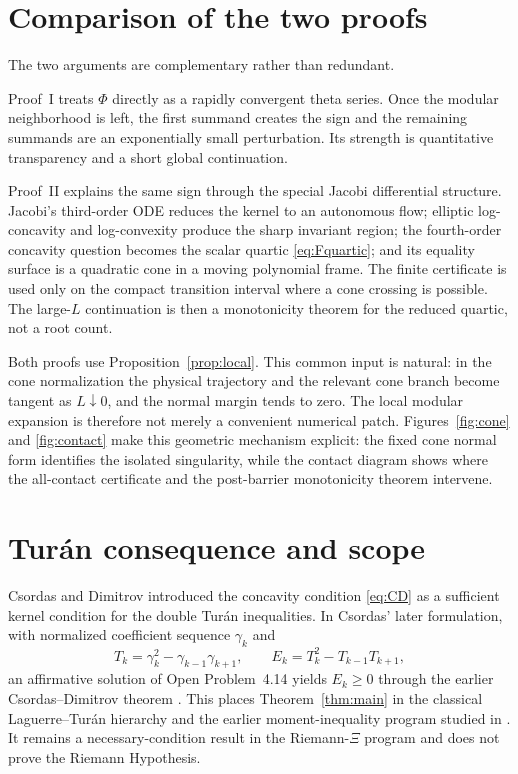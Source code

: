 \documentclass{amsart}
\numberwithin{equation}{section}
\theoremstyle{definition}
\theoremstyle{remark}
\begin{document}
\section{Comparison of the two proofs}
The two arguments are complementary rather than redundant.

Proof~I treats $\Phi$ directly as a rapidly convergent theta series.  Once the modular neighborhood is left, the first summand creates the sign and the remaining summands are an exponentially small perturbation.  Its strength is quantitative transparency and a short global continuation.

Proof~II explains the same sign through the special Jacobi differential structure.  Jacobi's third-order ODE reduces the kernel to an autonomous flow; elliptic log-concavity and log-convexity produce the sharp invariant region; the fourth-order concavity question becomes the scalar quartic \eqref{eq:Fquartic}; and its equality surface is a quadratic cone in a moving polynomial frame.  The finite certificate is used only on the compact transition interval where a cone crossing is possible.  The large-$L$ continuation is then a monotonicity theorem for the reduced quartic, not a root count.

Both proofs use Proposition~\ref{prop:local}.  This common input is natural: in the cone normalization the physical trajectory and the relevant cone branch become tangent as $L\downarrow0$, and the normal margin tends to zero.  The local modular expansion is therefore not merely a convenient numerical patch.  Figures~\ref{fig:cone} and \ref{fig:contact} make this geometric mechanism explicit: the fixed cone normal form identifies the isolated singularity, while the contact diagram shows where the all-contact certificate and the post-barrier monotonicity theorem intervene.

\section{Tur\'an consequence and scope}
Csordas and Dimitrov introduced the concavity condition \eqref{eq:CD} as a sufficient kernel condition for the double Tur\'an inequalities.  In Csordas' later formulation, with normalized coefficient sequence $\gamma_k$ and
\[
 T_k=\gamma_k^2-\gamma_{k-1}\gamma_{k+1},\qquad
 E_k=T_k^2-T_{k-1}T_{k+1},
\]
an affirmative solution of Open Problem~4.14 yields $E_k\ge0$ through the earlier Csordas--Dimitrov theorem \cite{CD2000,Csordas2015}.  This places Theorem~\ref{thm:main} in the classical Laguerre--Tur\'an hierarchy and the earlier moment-inequality program studied in \cite{CV1988,CravenCsordas2002,DimitrovLucas2011}.  It remains a necessary-condition result in the Riemann-$\Xi$ program and does not prove the Riemann Hypothesis.
\end{document}
